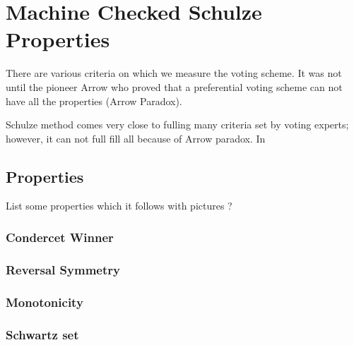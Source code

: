 \chapter{Machine Checked Schulze Properties}
\label{cha:machine_checked}
 There are various criteria on which we measure the voting scheme. It was not until the pioneer Arrow who proved 
 that a preferential voting scheme can not have all the properties (Arrow Paradox). 
 
 
 Schulze method comes very close to fulling many criteria set by voting experts; however, 
 it can not full fill all because of Arrow paradox. In  
 
 \section{Properties}
	 List some properties which it follows with pictures ?
 	\subsection{Condercet Winner}
 	\subsection{Reversal Symmetry}
 	\subsection{Monotonicity}
 	\subsection{Schwartz set}